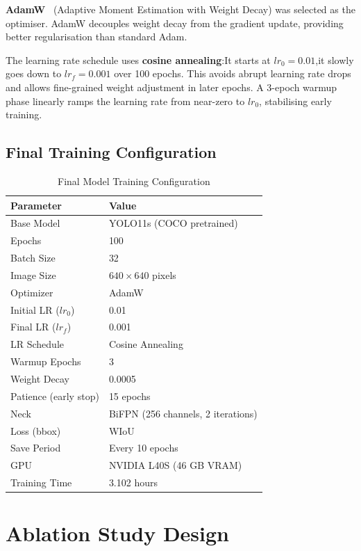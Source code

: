 \textbf{AdamW}~\cite{loshchilov2019adamw} (Adaptive Moment Estimation with Weight Decay) was selected as the optimiser. AdamW decouples weight decay from the gradient update, providing better regularisation than standard Adam.

The learning rate schedule uses \textbf{cosine annealing}:It starts at $lr_0 = 0.01$,it slowly goes down to $lr_f = 0.001$ over 100 epochs. This avoids abrupt learning rate drops and allows fine-grained weight adjustment in later epochs. A 3-epoch warmup phase linearly ramps the learning rate from near-zero to $lr_0$, stabilising early training.

\subsection{Final Training Configuration}

\begin{table}[H]
\centering
\caption{Final Model Training Configuration}
\label{tab:train_config}
\begin{tabular}{ll}
\toprule
\textbf{Parameter} & \textbf{Value} \\
\midrule
Base Model          & YOLO11s (COCO pretrained) \\
Epochs              & 100 \\
Batch Size          & 32 \\
Image Size          & $640 \times 640$ pixels \\
Optimizer           & AdamW \\
Initial LR ($lr_0$) & 0.01 \\
Final LR ($lr_f$)   & 0.001 \\
LR Schedule         & Cosine Annealing \\
Warmup Epochs       & 3 \\
Weight Decay        & 0.0005 \\
Patience (early stop) & 15 epochs \\
Neck                & BiFPN (256 channels, 2 iterations) \\
Loss (bbox)         & WIoU \\
Save Period         & Every 10 epochs \\
GPU                 & NVIDIA L40S (46 GB VRAM) \\
Training Time       & 3.102 hours \\
\bottomrule
\end{tabular}
\end{table}

\section{Ablation Study Design}

